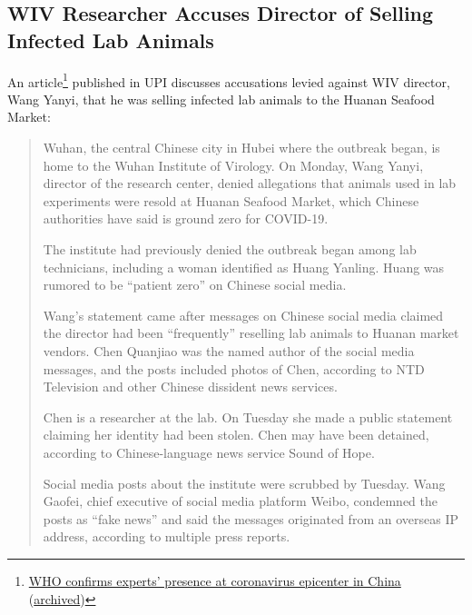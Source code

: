 \documentclass[11pt]{article}
\begin{document}
\subsection{WIV Researcher Accuses Director of Selling Infected Lab Animals}
\label{sec:org9e7cf76}
An article\footnote{\href{https://www.upi.com/Top\_News/World-News/2020/02/18/WHO-confirms-experts-presence-at-coronavirus-epicenter-in-China/8271582041808/}{WHO confirms experts' presence at coronavirus epicenter in China} (\href{https://archive.is/sGTiA}{archived})} published in UPI discusses accusations levied against WIV director, Wang Yanyi, that he was selling infected lab animals to the Huanan Seafood Market:
\begin{quote}
Wuhan, the central Chinese city in Hubei where the outbreak began, is home to the Wuhan Institute of Virology. On Monday, Wang Yanyi, director of the research center, denied allegations that animals used in lab experiments were resold at Huanan Seafood Market, which Chinese authorities have said is ground zero for COVID-19.

The institute had previously denied the outbreak began among lab technicians, including a woman identified as Huang Yanling. Huang was rumored to be ``patient zero'' on Chinese social media.

Wang’s statement came after messages on Chinese social media claimed the director had been ``frequently'' reselling lab animals to Huanan market vendors. Chen Quanjiao was the named author of the social media messages, and the posts included photos of Chen, according to NTD Television and other Chinese dissident news services.

Chen is a researcher at the lab. On Tuesday she made a public statement claiming her identity had been stolen. Chen may have been detained, according to Chinese-language news service Sound of Hope.

Social media posts about the institute were scrubbed by Tuesday. Wang Gaofei, chief executive of social media platform Weibo, condemned the posts as ``fake news'' and said the messages originated from an overseas IP address, according to multiple press reports.
\end{quote}
\end{document}
